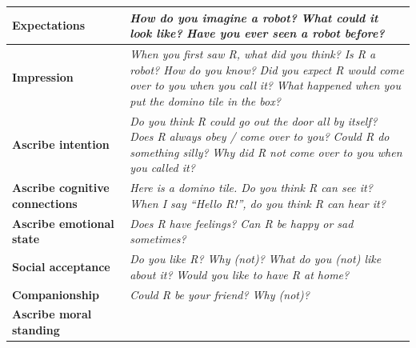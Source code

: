 \documentclass{frontiersSCNS} %
\begin{document}
\begin{table}
\centering
\begin{tabular}{lp{10cm}}
    \toprule
    \textbf{Expectations}  &
    \emph{How do you imagine a robot?} \newline
    \emph{What could it look like?} \newline
    \emph{Have you ever seen a robot before?}
    \\
    \midrule
    \textbf{Impression} &

    \emph{When you first saw R, what did you think?} \newline
    \emph{Is R a robot? How do you know?} \newline
    \emph{Did you expect R would come over to you when you call it?} \newline
    \emph{What happened when you put the domino tile in the box?}
    \\

    \midrule
    \textbf{Ascribe intention} &

    \emph{Do you think R could go out the door all by itself?} \newline
    \emph{Does R always obey / come over to you?} \newline
    \emph{Could R do something silly?} \newline
    \emph{Why did R not come over to you when you called it?}
    \\
    \midrule
    \textbf{Ascribe cognitive connections} &


    \emph{Here is a domino tile. Do you think R can see it?} \newline
    \emph{When I say \textit{``Hello R!''}, do you think R can hear it?}
    \\
    \midrule
    \textbf{Ascribe emotional state} &


    \emph{Does R have feelings? Can R be happy or sad sometimes?}
    \\
    \midrule
    \textbf{Social acceptance} &


    \emph{Do you like R? Why (not)?} \newline
    \emph{What do you (not) like about it?} \newline
    \emph{Would you like to have R at home?}
    \\
    \midrule
    \textbf{Companionship} &

    \emph{Could R be your friend? Why (not)?}
    \\
    \midrule
    \textbf{Ascribe moral standing} &



\end{tabular}
\end{table}
\end{document}
